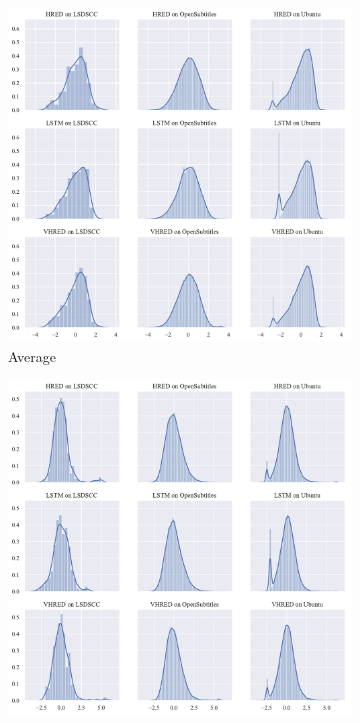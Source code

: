 \begin{figure}[H]
    \centering
    \begin{subfigure}{0.5\linewidth}
        \includegraphics[width=\linewidth]{figure/distplot_grid/embedding_based_vector_average/plot.pdf}
        \centering
        \caption{Average}
    \end{subfigure}%
    \begin{subfigure}{0.5\linewidth}
        \includegraphics[width=\linewidth]{figure/distplot_grid/embedding_based_vector_extrema/plot.pdf}

\end{subfigure}
\end{figure}
